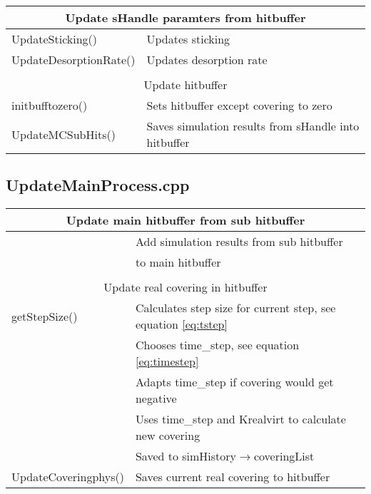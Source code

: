 \begin{center}
\begin{tabular}{|l|l|}
\hline
\multicolumn{2}{|c|}{\rule{0pt}{3ex}Update sHandle paramters from hitbuffer}\\
\hline
\rule{0pt}{3ex} UpdateSticking()& Updates sticking\\
\rule{0pt}{3ex} UpdateDesorptionRate()& Updates desorption rate \\
\hline
\multicolumn{2}{l}{}\\[1ex]
\hline
\multicolumn{2}{|c|}{\rule{0pt}{3ex}Update hitbuffer}\\
\hline
\rule{0pt}{3ex} initbufftozero()& Sets hitbuffer except covering to zero\\
\rule{0pt}{3ex} UpdateMCSubHits()& Saves simulation results from sHandle into hitbuffer\\
\hline
\end{tabular}
\end{center}
\newpage
\subsection{UpdateMainProcess.cpp}
\begin{center}
\begin{tabular}{|l|l|}
\hline
\multicolumn{2}{|c|}{\rule{0pt}{3ex}Update main hitbuffer from sub hitbuffer}\\
\hline
\rule{0pt}{3ex}  \multirow{2}{*}{UpdateMCMainHits()}& Add simulation results from sub hitbuffer\\& to main hitbuffer\\
\hline
\multicolumn{2}{l}{}\\[1ex]
\hline
\multicolumn{2}{|c|}{\rule{0pt}{3ex}Update real covering in hitbuffer}\\
\hline
\rule{0pt}{3ex} getStepSize()& Calculates step size for current step, see equation \ref{eq:tstep}\\
\rule{0pt}{3ex} \multirow{2}{*}{manageTimeStep()}&Chooses time\_step, see equation \ref{eq:timestep}\\&  Adapts time\_step if covering would get negative\\
\rule{0pt}{3ex} \multirow{3}{*}{UpdateCovering()}& Uses time\_step and Krealvirt to calculate new covering\\
& Saved to simHistory$\rightarrow$coveringList\\
\rule{0pt}{3ex} UpdateCoveringphys()& Saves current real covering to hitbuffer\\
\hline
\end{tabular}
\end{center}

